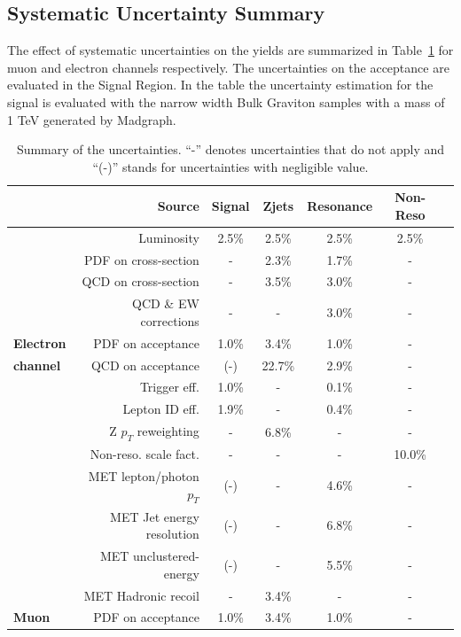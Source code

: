 \subsection{Systematic Uncertainty Summary}
The effect of systematic uncertainties on the yields are summarized in Table~\ref{tab:unc_summary} for muon and electron channels respectively. The uncertainties on the acceptance are evaluated in the Signal Region. In the table the uncertainty estimation for the signal is evaluated with the narrow width Bulk Graviton samples with a mass of 1 TeV generated by Madgraph.
\begin{table}[htbp]
\caption{Summary of the uncertainties. ``-'' denotes uncertainties that do not apply and ``(-)'' stands for uncertainties with negligible value.} 
\label{tab:unc_summary}
\begin{center}
\begin{footnotesize}
\begin{tabular}{l r c c c c c }
\hline\hline
%
{}	&	Source				&	Signal 	&	Zjets		&	Resonance		&	Non-Reso 				\\ \hline\hline
{}	&	Luminosity			&	2.5\%	&	2.5\%		&	2.5\%			&	2.5\%					\\
{}	&	PDF on cross-section		&	-	&	2.3\%		&	1.7\%			&	-						\\
{}	&	QCD on cross-section		&	-	&	3.5\%		&	3.0\%			&	-						\\
{}	&	QCD \& EW corrections		&	-	&	-		&	3.0\%			&	-						\\
\hline\hline
{\bf Electron}&PDF on acceptance		&	1.0\%	&	3.4\%		&	1.0\%			&	-						\\
{\bf channel}&QCD on acceptance			&  	(-)	&	22.7\%		&	2.9\%			&	-						\\ 
{}	&	Trigger eff.			&	1.0\%	&	-		&	0.1\%			&	-						\\
{}	&	Lepton ID eff.			&	1.9\%	&	-		&	0.4\%			&	-						\\
{}	&	Z $p_T$ reweighting		&	-	&	6.8\%		&	-			&	-						\\
{}	&	Non-reso. scale fact.		&	-	&	-		&	-			&	10.0\%					\\ 
{}	&	MET lepton/photon $p_T$ 	&	(-)	&	-		&	4.6\%			&	-						\\
{}	&	MET Jet energy resolution	&	(-)	&	-		&	6.8\%			&	-						\\
{}	&	MET unclustered-energy		&	(-)	&	-		&	5.5\%			&	-						\\
{}	&	MET Hadronic recoil		&	-	&	3.4\%		&	-			&	-						\\ 
\hline\hline
{\bf Muon}&PDF on acceptance			&	1.0\%	&	3.4\%		&	1.0\%			&	-						\\

\end{tabular}
\end{footnotesize}
\end{center}
\end{table}
